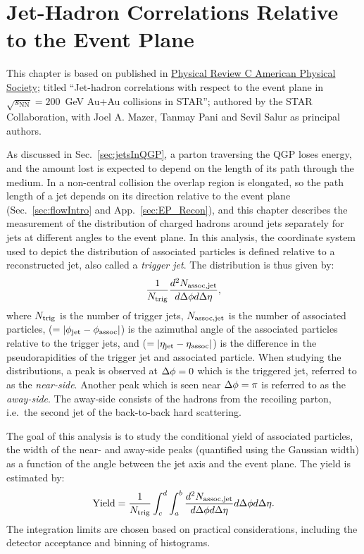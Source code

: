 \chapter{Jet-Hadron Correlations Relative to the Event Plane}
\label{ch:jhcorr}
\begin{itquote}
This chapter is based on \cite{STAR:2023hye} published in \href{https://doi.org/10.1103/PhysRevC.109.044909}{Physical Review C \textcopyright{} American Physical Society}; titled ``Jet-hadron correlations with respect to the event plane in \(\sqrt{s_\mathrm{NN}} = 200\)~GeV Au+Au collisions in STAR''; authored by the STAR Collaboration, with Joel A. Mazer, Tanmay Pani and Sevil Salur as principal authors.
\end{itquote}
As discussed in Sec.~\ref{sec:jetsInQGP}, a parton traversing the QGP loses energy, and the amount lost is expected to depend on the length of its path through the medium.
%
In a non-central collision the overlap region is elongated, so the path length of a jet depends on its direction relative to the event plane (Sec.~\ref{sec:flowIntro} and App.~\ref{sec:EP_Recon}), and this chapter describes the measurement of the distribution of charged hadrons around jets separately for jets at different angles to the event plane.
%
In this analysis, the coordinate system used to depict the distribution of associated particles is defined relative to a reconstructed jet, also called a \emph{trigger jet}. 
%
The distribution is thus given by:
%
\begin{equation}
	\frac{1}{N_{\rm trig}} \frac{d^2 N_{\rm assoc,jet}}{d\Delta\phi d\Delta\eta},
	\label{Eq:JHCorrIntro}
\end{equation}
%
\noindent where $N_{\rm trig}$ is the number of trigger jets, $N_{\rm assoc,jet}$ is the number of associated particles, \dphi ($=|\phi_{\rm jet}-\phi_{\rm assoc}|$) is the azimuthal angle of the associated particles relative to the trigger jets, and \deta ($=|\eta_{\rm jet}-\eta_{\rm assoc}|$) is the difference in the pseudorapidities of the trigger jet and associated particle.  
%
When studying the \dphi distributions, a peak is observed at $\Delta\phi = 0$ which is the triggered jet, referred to as the \emph{near-side}.  
%
Another peak which is seen near $\Delta\phi = \pi$ is referred to as the \emph{away-side}.  
%
The away-side consists of the hadrons from the recoiling parton, i.e.\ the second jet of the back-to-back hard scattering.

The goal of this analysis is to study the conditional yield of associated particles, the width of the near- and away-side peaks (quantified using the Gaussian width) as a function of the angle between the jet axis and the event plane.  The yield is estimated by:
%
\begin{equation}
	\mathrm{Yield} = \frac{1}{N_{\rm trig}} \int_{c}^{d} \int_{a}^{b} 
	\frac{d^2N_{\rm assoc,jet}}{d\Delta\phi d\Delta\eta}  d\Delta\phi d\Delta\eta.
	\label{Eqtn:Yield}
\end{equation}
%
The integration limits are chosen based on practical considerations, including the detector acceptance and binning of histograms.  

